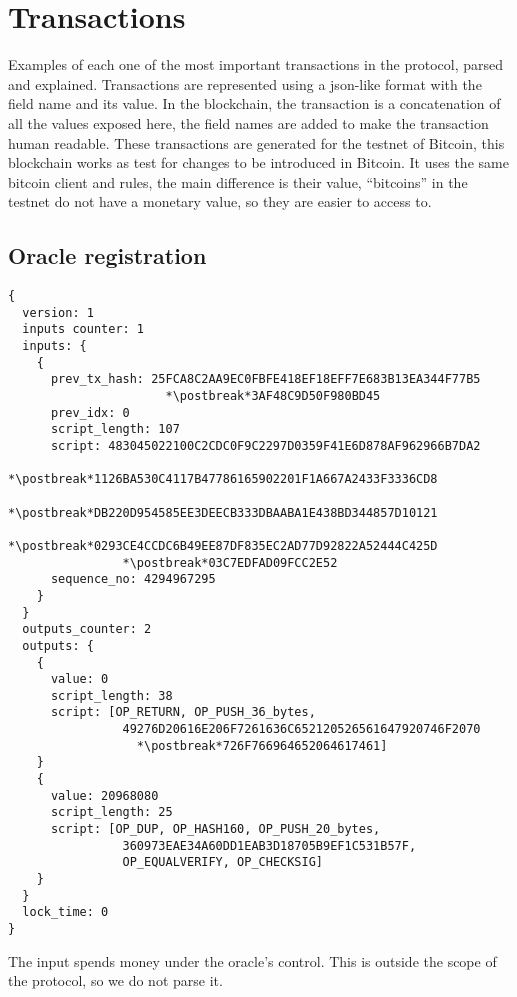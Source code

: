 \section{Transactions} \label{sec:appendix_transactions}
Examples of each one of the most important transactions in the protocol,
  parsed and explained.
Transactions are represented using a json-like format with the field name
  and its value.
In the blockchain, the transaction is a concatenation of all the values
  exposed here, the field names are added to make the transaction human
  readable.
These transactions are generated for the testnet of Bitcoin, this blockchain
  works as test for changes to be introduced in Bitcoin.
It uses the same bitcoin client and rules, the main difference is their value,
  ``bitcoins'' in the testnet do not have a monetary value, so they are easier
  to access to.

\lstset{%
  basicstyle=\ttfamily,
  columns=fullflexible,
  tabsize=2,
  linewidth=10cm,
  escapechar=*,
}
\newcommand{\postbreak}[0]{\mbox{\textcolor{red}{$\hookrightarrow$}\space}}
\subsection{Oracle registration}
\begin{lstlisting}
{
  version: 1
  inputs counter: 1
  inputs: {
    {
      prev_tx_hash: 25FCA8C2AA9EC0FBFE418EF18EFF7E683B13EA344F77B5
                      *\postbreak*3AF48C9D50F980BD45
      prev_idx: 0
      script_length: 107
      script: 483045022100C2CDC0F9C2297D0359F41E6D878AF962966B7DA2
                *\postbreak*1126BA530C4117B47786165902201F1A667A2433F3336CD8
                *\postbreak*DB220D954585EE3DEECB333DBAABA1E438BD344857D10121
                *\postbreak*0293CE4CCDC6B49EE87DF835EC2AD77D92822A52444C425D
                *\postbreak*03C7EDFAD09FCC2E52
      sequence_no: 4294967295
    }
  }
  outputs_counter: 2
  outputs: {
    {
      value: 0
      script_length: 38
      script: [OP_RETURN, OP_PUSH_36_bytes,
                49276D20616E206F7261636C652120526561647920746F2070
                  *\postbreak*726F766964652064617461]
    }
    {
      value: 20968080
      script_length: 25
      script: [OP_DUP, OP_HASH160, OP_PUSH_20_bytes,
                360973EAE34A60DD1EAB3D18705B9EF1C531B57F,
                OP_EQUALVERIFY, OP_CHECKSIG]
    }
  }
  lock_time: 0
}
\end{lstlisting}

The input spends money under the oracle's control. This is outside the scope
  of the protocol, so we do not parse it.

